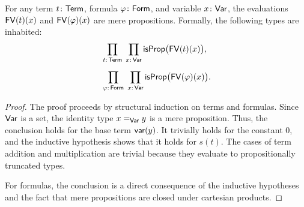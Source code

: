 \begin{prop}\label{prop:FV-is-mere-prop}
    For any term\/ $t\colon\fun{Term}$, formula\/ $\varphi\colon\fun{Form}$, and variable\/ $x\colon\fun{Var}$, the evaluations\/ $\mathsf{FV}(t)(x)$ and\/ $\mathsf{FV}(\varphi)(x)$ are mere propositions. Formally, the following types are inhabited:
    \begin{align*}
        &\prod_{t\colon\fun{Term}}\;
        \prod_{x\colon\fun{Var}}
            \fun{isProp}\bigl(\fun{FV}(t)(x)\bigr),\\[2mm]
        &\prod_{\varphi\colon\fun{Form}}\;
        \prod_{x\colon\fun{Var}}
            \fun{isProp}\bigl(\fun{FV}(\varphi)(x)\bigr).
    \end{align*}
\end{prop}

\begin{proof}
    The proof proceeds by structural induction on terms and formulas. Since $\mathsf{Var}$ is a set, the identity type $x\mathrel{=_{\mathsf{Var}}}y$ is a mere proposition. Thus, the conclusion holds for the base term $\mathsf{var}(y)$. It trivially holds for the constant $0$, and the inductive hypothesis shows that it holds for $s(t)$. The cases of term addition and multiplication are trivial because they evaluate to propositionally truncated types.

    For formulas, the conclusion is a direct consequence of the inductive hypotheses and the fact that mere propositions are closed under cartesian products.
    
\end{proof}

